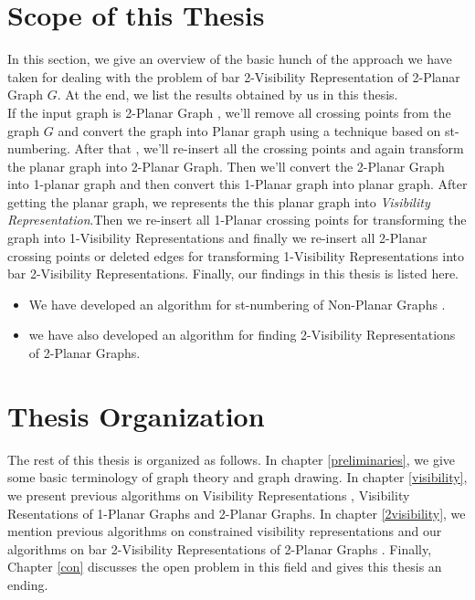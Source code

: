 \section{Scope of this Thesis}
\label{sec:scope}

In this section, we give an overview of the basic hunch of the approach we have taken for dealing with the problem of bar 2-Visibility Representation of 2-Planar Graph $G$. At the end, we list the results obtained by us in this thesis.\\
If the input graph is 2-Planar Graph , we'll remove all crossing points from the graph $G$ and convert the graph into Planar graph using a technique based on st-numbering. After that , we'll re-insert all the crossing points and again transform the planar graph into 2-Planar Graph. Then we'll convert the 2-Planar Graph into 1-planar graph and then convert this 1-Planar graph into planar graph. After getting the planar graph, we represents the this planar graph into \emph{Visibility Representation}\cite{R}.Then we re-insert all 1-Planar crossing points for transforming the graph into 1-Visibility Representations and finally we re-insert all 2-Planar crossing points or deleted edges for transforming 1-Visibility Representations into bar 2-Visibility Representations. Finally, our findings in this thesis is listed here.


\begin{itemize}
\item We have developed an algorithm for st-numbering of Non-Planar Graphs .
\item we have also developed an algorithm for finding 2-Visibility Representations of 2-Planar Graphs.

\end{itemize}



\section{Thesis Organization}
\label{sec:thesis}
The rest of this thesis is organized as follows. In chapter \ref{preliminaries}, we give some basic terminology of graph theory and graph drawing. In chapter \ref{visibility}, we present previous algorithms on Visibility Representations , Visibility Resentations of 1-Planar Graphs and 2-Planar Graphs. In chapter  \ref{2visibility}, we mention previous algorithms on constrained visibility representations and our algorithms on bar 2-Visibility Representations of 2-Planar Graphs . Finally, Chapter  \ref{con} discusses the open problem in this field and gives this thesis an ending.




\endinput
